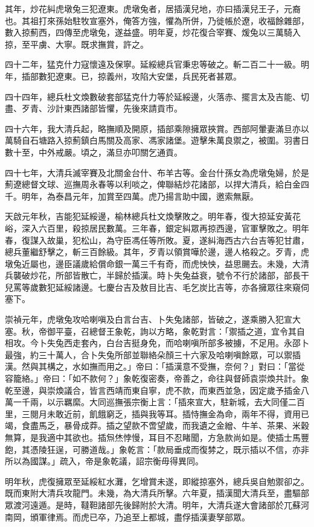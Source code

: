 \begin{pinyinscope}
其年，炒花糾虎墩兔三犯遼東。虎墩兔者，居插漢兒地，亦曰插漢兒王子，元裔也。其祖打來孫始駐牧宣塞外，俺答方強，懼為所併，乃徙帳於遼，收福餘雜部，數入掠薊西，四傳至虎墩兔，遂益盛。明年夏，炒花復合宰賽、煖兔以三萬騎入掠，至平虜、大寧。既求撫賞，許之。

四十二年，猛克什力寇懷遠及保寧。延綏總兵官秉忠等破之。斬二百二十一級。明年，插部數犯遼東。已，掠義州，攻陷大安堡，兵民死者甚眾。

四十四年，總兵杜文煥數破套部猛克什力等於延綏邊，火落赤、擺言太及吉能、切盡、歹青、沙計東西諸部皆懼，先後來請貢市。

四十六年，我大清兵起，略撫順及開原，插部乘隙擁眾挾賞。西部阿暈妻滿旦亦以萬騎自石塘路入掠薊鎮白馬關及高家、馮家諸堡。遊擊朱萬良禦之，被圍。羽書日數十至，中外戒嚴。頃之，滿旦亦叩關乞通貢。

四十七年，大清兵滅宰賽及北關金台什、布羊古等。金台什孫女為虎墩兔婦，於是薊遼總督文球、巡撫周永春等以利啖之，俾聯結炒花諸部，以捍大清兵，給白金四千。明年，為泰昌元年，加賞至四萬。虎乃揚言助中國，邀索無厭。

天啟元年秋，吉能犯延綏邊，榆林總兵杜文煥擊敗之。明年春，復大掠延安黃花峪，深入六百里，殺掠居民數萬。三年春，銀定糾眾再掠西邊，官軍擊敗之。明年春，復謀入故巢，犯松山，為守臣馮任等所敗。夏，遂糾海西古六台吉等犯甘肅，總兵董繼舒擊之，斬三百餘級。其年，歹青以領賞嘩於邊，邊人格殺之。歹青，虎墩兔近屬也，邊臣議歲給償命銀一萬三千有奇，而虎怏怏，益思颺去。未幾，大清兵襲破炒花，所部皆散亡，半歸於插漢。時卜失兔益衰，號令不行於諸部，部長干兒罵等歲數犯延綏諸邊。七慶台吉及敖目比吉、毛乞炭比吉等，亦各擁眾往來窺伺塞下。

崇禎元年，虎墩兔攻哈喇嗔及白言台吉、卜失兔諸部，皆破之，遂乘勝入犯宣大塞。秋，帝御平臺，召總督王象乾，詢以方略，象乾對言：「禦插之道，宜令其自相攻。今卜失兔西走套內，白台吉挺身免，而哈喇嗔所部多被擄，不足用。永邵卜最強，約三十萬人，合卜失兔所部並聯絡朵顏三十六家及哈喇嗔餘眾，可以禦插漢。然與其構之，水如撫而用之。」帝曰：「插漢意不受撫，奈何？」對曰：「當從容籠絡。」帝曰：「如不款何？」象乾復密奏，帝善之，命往與督師袁崇煥共計。象乾至邊，與崇煥議合，皆言西靖而東自寧，虎不款，而東西並急，因定歲予插金八萬一千兩，以示羈縻。大同巡撫張宗衡上言：「插來宣大，駐新城，去大同僅二百里，三閱月未敢近前，飢餓窮乏，插與我等耳。插恃撫金為命，兩年不得，資用已竭，食盡馬乏，暴骨成莽。插之望款不啻望歲，而我遺之金繒、牛羊、茶果、米穀無算，是我適中其欲也。插炰烋悖慢，耳目不忍睹聞，方急款尚如是。使插士馬豐飽，其憑陵狂逞，可勝道哉。」象乾言：「款局垂成而復棼之，既示插以不信，亦非所以為國謀。」疏入，帝是象乾議，詔宗衡毋得異同。

明年秋，虎復擁眾至延綏紅水灘，乞增賞未遂，即縱掠塞外，總兵吳自勉禦卻之。既而東附大清兵攻龍門。未幾，為大清兵所擊。六年夏，插漢聞大清兵至，盡驅部眾渡河遠遁。是時，韃靼諸部先後歸附於大清。明年，大清兵遂大會諸部於兀蘇河南岡，頒軍律焉。而虎已卒，乃追至上都城，盡俘插漢妻孥部眾。


\end{pinyinscope}
